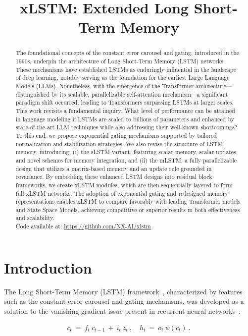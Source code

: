 \title{xLSTM: Extended Long Short-Term Memory}

\begin{abstract}
The foundational concepts of the constant error carousel and gating, introduced in the 1990s, underpin the architecture of Long Short-Term Memory (LSTM) networks. These mechanisms have established LSTMs as enduringly influential in the landscape of deep learning, notably serving as the foundation for the earliest Large Language Models (LLMs). Nonetheless, with the emergence of the Transformer architecture—distinguished by its scalable, parallelizable self-attention mechanism—a significant paradigm shift occurred, leading to Transformers surpassing LSTMs at larger scales. This work revisits a fundamental inquiry: What level of performance can be attained in language modeling if LSTMs are scaled to billions of parameters and enhanced by state-of-the-art LLM techniques while also addressing their well-known shortcomings? To this end, we propose exponential gating mechanisms supported by tailored normalization and stabilization strategies. We also revise the structure of LSTM memory, introducing: (i) the sLSTM variant, featuring scalar memory, scalar updates, and novel schemes for memory integration, and (ii) the mLSTM, a fully parallelizable design that utilizes a matrix-based memory and an update rule grounded in covariance. By embedding these enhanced LSTM designs into residual block frameworks, we create xLSTM modules, which are then sequentially layered to form full xLSTM networks. The adoption of exponential gating and redesigned memory representations enables xLSTM to compare favorably with leading Transformer models and State Space Models, achieving competitive or superior results in both effectiveness and scalability.\\
Code available at: \url{https://github.com/NX-AI/xlstm}
\end{abstract}

\section{Introduction}
\label{sec:intro}

The Long Short-Term Memory (LSTM) framework~\citep{Hochreiter:91,Hochreiter:97nips,Hochreiter:97}, characterized by features such as the constant error carousel and gating mechanisms, was developed as a solution to the vanishing gradient issue present in recurrent neural networks~\citep{Hochreiter:91,Hochreiter:00book}:

\begin{align}
\label{eq:lstm_idea}
  c_t \ = \ f_t \ c_{t-1} \ + \ 
          i_t \  z_t \ , \quad  
          h_t \ = \ o_t \ \psi({c_t}) \ . 
\end{align}

